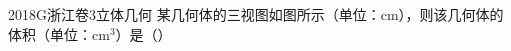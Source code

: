
\begin{problem}{2018}{G}{浙江卷}{3}{立体几何}
某几何体的三视图如图所示（单位：cm），则该几何体的体积（单位：cm$^3$）是（\hspace{1cm}）


\begin{choices}
\end{choices}
\end{problem}

\begin{answer}

\end{answer}

\begin{solutions}

\end{solutions}